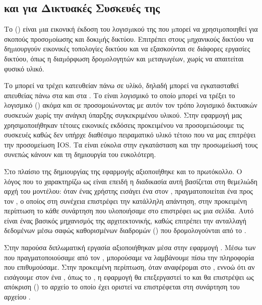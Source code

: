 \subsection{ και  για Δικτυακές Συσκευές της   }

Το  () είναι µια εικονική έκδοση του λογισµικού  της  που µπορεί να χρησιµοποιηθεί για σκοπούς προσοµοίωσης και δοκιµής δικτύου. Επιτρέπει στους µηχανικούς δικτύου να δηµιουργούν εικονικές τοπολογίες δικτύου και να εξασκούνται σε διάφορες εργασίες δικτύου, όπως η διαµόρφωση δροµολογητών και µεταγωγέων, χωρίς να απαιτείται φυσικό υλικό. 


Το  μπορεί να τρέχει κατευθείαν πάνω σε υλίκό, δηλαδή μπορεί να εγκατασταθεί απευθείας πάνω στα  και στα  . Το  είναι λογισμικό το οποίο μπορεί να τρέξει το λογισμικό () ακόμα και σε  προσομοιώνοντας με αυτόν τον τρόπο λογισμικό δικτυακών συσκευών χωρίς την ανάγκη ύπαρξης συγκεκριμένου υλικού. Στην εφαρμογή μας χρησιμοποιήθηκαν τέτοιες εικονικές εκδόσεις προκειμένου να προσομειώσουμε τις  συσκευές καθώς δεν υπήρχε διαθέσιμο πειραματικό υλικό τέτοιο που να μας επιτρέψει την προσομείωση IOS. Τα  είναι εύκολα στην εγκατάσταση και την προσωμείωσή τους συνεπώς κάνουν και τη δημιουργία του  ευκολότερη.

Στο πλαίσιο της δημιουργίας της εφαρμογής αξιοποιήθηκε και το  πρωτόκολλο. Ο λόγος που το χαρακτηρίζω ως  είναι επειδή η διαδικασία αυτή βασίζεται στη θεμελιώδη αρχή του   μοντέλου: όταν ένας χρήστης εισάγει ένα  στον , πραγματοποιείται ένα  προς τον , ο οποίος στη συνέχεια επιστρέφει την κατάλληλη απάντηση, στην προκειμένη περίπτωση το κάθε συνάρτηση που υλοποιήσαμε στο  επιστρέφει ως   μια  σελίδα. Αυτό είναι ένας βασικός μηχανισμός της  αρχιτεκτονικής, καθώς επιτρέπει την ανταλλαγή δεδομένων μέσω σαφώς καθορισμένων διαδρομών () που δρομολογούνται από το .

Στην παρούσα διπλωματική εργασία αξιοποιήθηκαν  μέσα στην εφαρμογή . Μέσω των   που πραγματοποιούσαμε από τον , μπορούσαμε να λαμβάνουμε πίσω την πληροφορία που επιθυμούσαμε. Στην προκειμένη περίπτωση, όταν αναφέρομαι στο , εννοώ ότι αν εισάγουμε στον  ένα , όπως το , η εφαρμογή θα επεξεργαστεί το  και θα επιστρέψει ως απόκριση () το αρχείο  το οποίο έχει οριστεί να επιστρέφεται στη συνάρτηση  του αρχείου .

